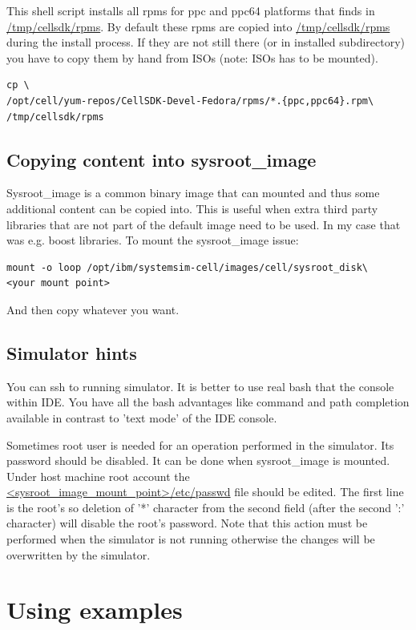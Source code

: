 This shell script installs all rpms for ppc and ppc64 platforms that finds in \url{/tmp/cellsdk/rpms}.
By default these rpms are copied into \url{/tmp/cellsdk/rpms} during the install process.
If they are not still there (or in installed subdirectory) you have to copy them by hand from ISOs (note: ISOs has to be mounted).

\begin{verbatim}
cp \
/opt/cell/yum-repos/CellSDK-Devel-Fedora/rpms/*.{ppc,ppc64}.rpm\
/tmp/cellsdk/rpms
\end{verbatim}

\subsection{Copying content into sysroot\_image}

Sysroot\_image is a common binary image that can mounted and thus some additional content can be copied into.
This is useful when extra third party libraries that are not part of the default image need to be used.
In my case that was e.g. boost libraries.
To mount the sysroot\_image issue:
\begin{verbatim}
mount -o loop /opt/ibm/systemsim-cell/images/cell/sysroot_disk\
<your mount point>
\end{verbatim}
And then copy whatever you want.

\subsection{Simulator hints}

\par
You can ssh to running simulator. It is better to use real bash that the console within IDE.
You have all the bash advantages like command and path completion available in contrast to 'text mode' of the IDE console.

\par
Sometimes root user is needed for an operation performed in the simulator.
Its password should be disabled.
It can be done when sysroot\_image is mounted.
Under host machine root account the \url{<sysroot_image_mount_point>/etc/passwd} file should be edited.
The first line is the root's so deletion of '*' character from the second field (after the second ':' character) will disable the root's password.
Note that this action must be performed when the simulator is not running otherwise the changes will be overwritten by the simulator.

\section{Using examples}

